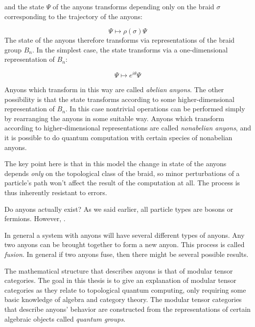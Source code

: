 and the state $\Psi$ of the anyons transforms depending only on the braid $\sigma$ corresponding to the trajectory of the anyons:

\begin{equation}
    \Psi \mapsto \rho(\sigma)\Psi
\end{equation}
The state of the anyons therefore transforms via representations of the braid
group $B_n$. In the simplest case, the state transforms via a one-dimensional
representation of $B_n$:

\begin{equation}
    \Psi \mapsto e^{i\theta}\Psi
\end{equation}

Anyons which transform in this way are called \emph{abelian anyons}. The other
possibility is that the state transforms according to some higher-dimensional
representation of $B_n$. In this case nontrivial operations can be performed
simply by rearranging the anyons in some suitable way. Anyons which transform
according to higher-dimensional representations are called \emph{nonabelian
anyons}, and it is possible to do quantum computation with certain species
of nonabelian anyons.

The key point here is that in this model the change in state of the anyons
depends \emph{only} on the topological class of the braid, so minor
perturbations of a particle's path won't affect the result of the computation
at all. The process is thus inherently resistant to errors. 

Do anyons actually exist? As we said earlier, all particle types are bosons or
fermions. However, .

In general a system with anyons will have several different types of anyons.
Any two anyons can be brought together to form a new anyon. This process is
called \emph{fusion}. In general if two anyons fuse, then there might be
several possible results. 

The mathematical structure that describes anyons is that of modular tensor
categories. The goal in this thesis is to give an explanation of modular tensor
categories as they relate to topological quantum computing, only requiring some
basic knowledge of algebra and category theory. The modular tensor categories
that describe anyons' behavior are constructed from the representations of
certain algebraic objects called \emph{quantum groups}.

